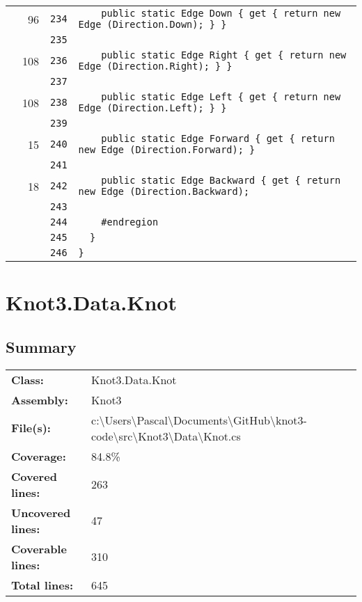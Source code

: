 \documentclass[a4paper,10pt]{article}
\begin{document}
\begin{longtable}[l]{lrrl}
\cellcolor{green} & 96 & \verb~234~ & \verb~    public static Edge Down { get { return new Edge (Direction.Down); } }~\\
\cellcolor{gray} &  & \verb~235~ & \verb~~\\
\cellcolor{green} & 108 & \verb~236~ & \verb~    public static Edge Right { get { return new Edge (Direction.Right); } }~\\
\cellcolor{gray} &  & \verb~237~ & \verb~~\\
\cellcolor{green} & 108 & \verb~238~ & \verb~    public static Edge Left { get { return new Edge (Direction.Left); } }~\\
\cellcolor{gray} &  & \verb~239~ & \verb~~\\
\cellcolor{green} & 15 & \verb~240~ & \verb~    public static Edge Forward { get { return new Edge (Direction.Forward); } ~\\
\cellcolor{gray} &  & \verb~241~ & \verb~~\\
\cellcolor{green} & 18 & \verb~242~ & \verb~    public static Edge Backward { get { return new Edge (Direction.Backward); ~\\
\cellcolor{gray} &  & \verb~243~ & \verb~~\\
\cellcolor{gray} &  & \verb~244~ & \verb~    #endregion~\\
\cellcolor{gray} &  & \verb~245~ & \verb~  }~\\
\cellcolor{gray} &  & \verb~246~ & \verb~}~\\
\end{longtable}
\newpage
\section{Knot3.Data.Knot}
\subsection{Summary}
\begin{longtable}[l]{ll}
\textbf{Class:} & Knot3.Data.Knot\\
\textbf{Assembly:} & Knot3\\
\textbf{File(s):} & \begin{minipage}[t]{12cm}{c:\textbackslash Users\textbackslash Pascal\textbackslash Documents\textbackslash GitHub\textbackslash knot3-code\textbackslash src\textbackslash Knot3\textbackslash Data\textbackslash Knot.cs}\end{minipage} \\
\textbf{Coverage:} & 84.8\%\\
\textbf{Covered lines:} & 263\\
\textbf{Uncovered lines:} & 47\\
\textbf{Coverable lines:} & 310\\
\textbf{Total lines:} & 645\\
\end{longtable}
\end{document}
